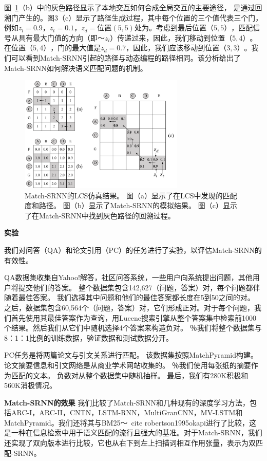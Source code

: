 图~\ref{fig:simulation}（b）中的灰色路径显示了本地交互如何合成全局交互的主要途径，
是通过回溯门产生的。图3（c）显示了路径生成过程，其中每个位置的三个值代表三个门，例如$ z_l {=} 0.9，z_t {=} 0.1，z_d {=}$位置$(5,5)$处为$ $。考虑到最后位置$（5,5）$，匹配信号从具有最大门值的方向（即〜$ z_l $）传递过来，因此，我们移动到位置$（5,4）$。在位置$（5,4）$，门的最大值是$ z_d {=} 0.7 $，因此，我们应该移动到位置$（3,3）$。我们可以看到Match-SRNN引起的路径与动态编程的路径相同。该分析给出了Match-SRNN如何解决语义匹配问题的机制。
\begin{figure}[t]
\centering
\includegraphics[width=0.7\textwidth]{figures/lcs_simulation_more.pdf}
\caption{Match-SRNN的LCS仿真结果。 图（a）显示了在LCS中发现的匹配度和路径。 图（b）显示了Match-SRNN的模拟结果。 图（c）显示了在Match-SRNN中找到灰色路径的回溯过程。}\label{fig:simulation}
\end{figure}


\textbf{实验}

我们对问答（QA）和论文引用（PC）的任务进行了实验，以评估Match-SRNN的有效性。

QA数据集收集自Yahoo!解答，社区问答系统，一些用户向系统提出问题，其他用户将提交他们的答案。
整个数据集包含142,627（问题，答案）对，每个问题都伴随着最佳答案。
我们选择其中问题和他们的最佳答案都长度在5到50之间的对。
之后，数据集包含60,564个（问题，答案）对，它们形成正对。对于每个问题，我们首先使用其最佳答案作为查询，用Lucene搜索引擎从整个答案集中检索前1000个结果。然后我们从它们中随机选择4个答案来构造负对。 ％我们将整个数据集与8：1：1比例的训练数据，验证数据和测试数据分开。

PC任务是将两篇论文与引文关系进行匹配。
该数据集按照MatchPyramid构建。
论文摘要信息和引文网络是从商业学术网站​​收集的。
％我们使用每张纸的摘要作为匹配的文本。
负数对从整个数据集中随机抽样。
最后，我们有280K积极和560K消极情况。

\textbf{Match-SRNN的效果}
我们比较了Match-SRNN和几种现有的深度学习方法，包括ARC-I，ARC-II，CNTN，LSTM-RNN，MultiGranCNN，MV-LSTM和MatchPyramid。我们还将其与BM25〜\ cite {robertson1995okapi}进行了比较，这是一种在信息检索中用于语义匹配的流行且强大的基准。对于Match-SRNN，我们还实现了双向版本进行比较，它也从右下到左上扫描词相互作用张量，表示为双匹配-SRNN。

